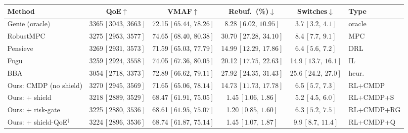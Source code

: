 \begin{tabularx}{\linewidth}{@{}>{\raggedright\arraybackslash}Xccccl@{}}
\toprule
\textbf{Method} & \textbf{QoE}$\uparrow$ & \textbf{VMAF}$\uparrow$ & \textbf{Rebuf.\ (\%)}$\downarrow$ & \textbf{Switches}$\downarrow$ & \textbf{Type} \\
\midrule
Genie (oracle)~\cite{mao2017neural} & 3365\,\scriptsize $[3043,\,3663]$ & 72.15\,\scriptsize $[65.44,\,78.26]$ & 8.28\,\scriptsize $[6.02,\,10.95]$ & 3.7\,\scriptsize $[3.2,\,4.1]$ & oracle \\
RobustMPC~\cite{yin2015control} & 3275\,\scriptsize $[2953,\,3577]$ & 74.65\,\scriptsize $[68.40,\,80.38]$ & 30.70\,\scriptsize $[27.28,\,34.10]$ & 8.4\,\scriptsize $[7.7,\,9.1]$ & MPC \\
Pensieve~\cite{mao2017neural} & 3269\,\scriptsize $[2931,\,3573]$ & 71.59\,\scriptsize $[65.03,\,77.79]$ & 14.99\,\scriptsize $[12.29,\,17.86]$ & 6.4\,\scriptsize $[5.6,\,7.2]$ & DRL \\
Fugu~\cite{yan2019learning} & 3259\,\scriptsize $[2924,\,3558]$ & 74.05\,\scriptsize $[67.36,\,80.05]$ & 20.12\,\scriptsize $[17.75,\,22.63]$ & 14.9\,\scriptsize $[13.7,\,16.1]$ & IL \\
BBA~\cite{huang2014buffer} & 3054\,\scriptsize $[2718,\,3373]$ & 72.89\,\scriptsize $[66.62,\,79.11]$ & 27.92\,\scriptsize $[24.35,\,31.43]$ & 25.6\,\scriptsize $[24.2,\,27.0]$ & heur. \\
Ours: CMDP (no shield) & 3270\,\scriptsize $[2945,\,3569]$ & 71.65\,\scriptsize $[65.06,\,78.14]$ & 14.73\,\scriptsize $[11.73,\,17.78]$ & 6.5\,\scriptsize $[5.7,\,7.3]$ & RL+CMDP \\
Ours: + shield & 3218\,\scriptsize $[2889,\,3529]$ & 68.47\,\scriptsize $[61.91,\,75.05]$ & 1.45\,\scriptsize $[1.06,\,1.86]$ & 5.2\,\scriptsize $[4.5,\,6.0]$ & RL+CMDP+S \\
Ours: + risk-gate & 3225\,\scriptsize $[2880,\,3536]$ & 68.61\,\scriptsize $[61.95,\,75.07]$ & 1.20\,\scriptsize $[0.85,\,1.60]$ & 6.3\,\scriptsize $[5.2,\,7.5]$ & RL+CMDP+RG \\
Ours: + shield-QoE$^{\dagger}$ & 3224\,\scriptsize $[2896,\,3536]$ & 68.74\,\scriptsize $[61.87,\,75.14]$ & 1.45\,\scriptsize $[1.07,\,1.87]$ & 9.9\,\scriptsize $[8.7,\,11.4]$ & RL+CMDP+Q \\
\bottomrule
\end{tabularx}